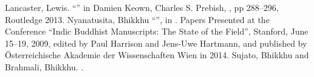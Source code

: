 \markdownRendererUlItem Lancaster, Lewis. “” in Damien Keown, Charles S. Prebish, , pp 288–296, Routledge 2013.\markdownRendererUlItemEnd 
\markdownRendererUlItem Nyanatusita, Bhikkhu “”, in . Papers Presented at the Conference “Indic Buddhist Manuscripts: The State of the Field”, Stanford, June 15–19, 2009, edited by Paul Harrison and Jens-Uwe Hartmann, and published by Österreichische Akademie der Wissenschaften Wien in 2014.\markdownRendererUlItemEnd 
\markdownRendererUlItem Sujato, Bhikkhu and Brahmali, Bhikkhu. .\markdownRendererUlItemEnd 
\markdownRendererUlEndTight \relax